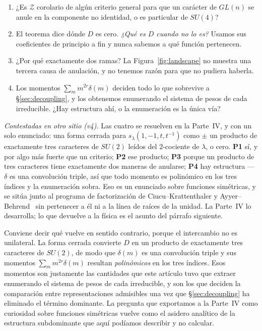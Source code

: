 \documentclass[11pt,a4paper]{article}
\newcommand{\su}[1]{SU(#1)}
\begin{document}
\begin{enumerate}\itemsep2pt
\item[\textbf{P1}] ¿Es $\mathcal Z$ corolario de algún criterio general para que un carácter de
$GL(n)$ se anule en la componente no identidad, o es particular de $\su4$?
\item[\textbf{P2}] El teorema dice dónde $D$ es cero. \emph{¿Qué es $D$ cuando no lo es?} Usamos
sus coeficientes de principio a fin y nunca sabemos a qué función pertenecen.
\item[\textbf{P3}] ¿Por qué exactamente dos ramas? La Figura~\ref{fig:landscape} no muestra una
tercera causa de anulación, y no tenemos razón para que no pudiera haberla.
\item[\textbf{P4}] Los momentos $\sum_m m^{2r}\delta(m)$ deciden todo lo que sobrevive a
\S\ref{sec:decoupling}, y los obtenemos enumerando el sistema de pesos de cada irreducible.
¿Hay estructura ahí, o la enumeración es la única vía?
\end{enumerate}

\emph{Contestadas en otro sitio (v4).} Las cuatro se resuelven en la Parte~IV, y con un solo
enunciado: una forma cerrada para $s_\lambda(1,-1,t,t^{-1})$ como $\pm$ un producto de
exactamente tres caracteres de $SU(2)$ leídos del $2$-cociente de $\lambda$, o cero. \textbf{P1}
sí, y por algo más fuerte que un criterio; \textbf{P2} ese producto; \textbf{P3} porque un
producto de tres caracteres tiene exactamente dos maneras de anularse; \textbf{P4} hay
estructura --- $\delta$ es una convolución triple, así que todo momento es polinómico en los
tres índices y la enumeración sobra. Eso es un enunciado sobre funciones simétricas, y se sitúa junto al programa de
factorización de Ciucu--Krattenthaler y Ayyer--Behrend~\cite{CiucuKrattenthaler,AyyerBehrend}
sin pertenecer a él ni a la línea de raíces de la unidad. La Parte~IV lo desarrolla; lo que
devuelve a la física es el asunto del párrafo siguiente.

Conviene decir qué vuelve en sentido contrario, porque el intercambio no es unilateral. La
forma cerrada convierte $D$ en un producto de exactamente tres caracteres de $SU(2)$, de modo
que $\delta(m)$ es una convolución triple y sus momentos $\sum_m m^{2r}\delta(m)$ resultan
\emph{polinómicos} en los tres índices. Esos momentos son justamente las cantidades que este
artículo tuvo que extraer enumerando el sistema de pesos de cada irreducible, y son los que
deciden la comparación entre representaciones admisibles una vez que \S\ref{sec:decoupling} ha
eliminado el término dominante. La pregunta que exportamos a la Parte~IV como curiosidad sobre
funciones simétricas vuelve como el asidero analítico de la estructura subdominante que aquí
podíamos describir y no calcular.
\end{document}
